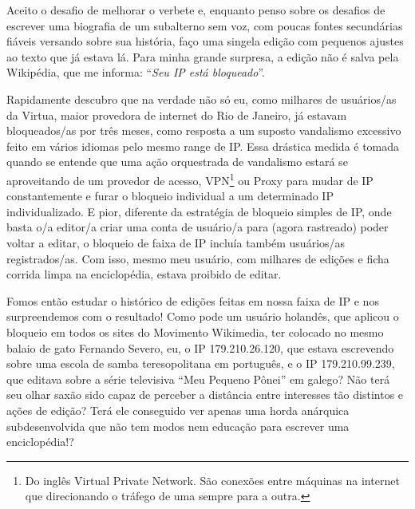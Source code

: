 Aceito o desafio de melhorar o verbete e, enquanto penso sobre os desafios de escrever uma biografia de um subalterno sem voz, com poucas fontes secundárias fiáveis versando sobre sua história, faço uma singela edição com pequenos ajustes ao texto que já estava lá. Para minha grande surpresa, a edição não é salva pela Wikipédia, que me informa: ``\textit{Seu IP está bloqueado}''.

Rapidamente descubro que na verdade não só eu, como milhares de usuários/as da Virtua, maior provedora de internet do Rio de Janeiro, já estavam bloqueados/as por três meses, como resposta a um suposto vandalismo excessivo feito em vários idiomas pelo mesmo range de IP. Essa drástica medida é tomada quando se entende que uma ação orquestrada de vandalismo estará se aproveitando de um provedor de acesso, VPN\footnote{Do inglês Virtual Private Network. São conexões entre máquinas na internet que direcionando o tráfego de uma sempre para a outra.} ou Proxy para mudar de IP constantemente e furar o bloqueio individual a um determinado IP individualizado. E pior, diferente da estratégia de bloqueio simples de IP, onde basta o/a editor/a criar uma conta de usuário/a para (agora rastreado) poder voltar a editar, o bloqueio de faixa de IP incluía também usuários/as registrados/as. Com isso, mesmo meu usuário, com milhares de edições e ficha corrida limpa na enciclopédia, estava proibido de editar.

Fomos então estudar o histórico de edições feitas em nossa faixa de IP e nos surpreendemos com o resultado! Como pode um usuário holandês, que aplicou o bloqueio em todos os sites do Movimento Wikimedia, ter colocado no mesmo balaio de gato Fernando Severo, eu, o IP 179.210.26.120, que estava escrevendo sobre uma escola de samba teresopolitana em português, e o IP 179.210.99.239, que editava sobre a série televisiva ``Meu Pequeno Pônei'' em galego? Não terá seu olhar saxão sido capaz de perceber a distância entre interesses tão distintos e ações de edição? Terá ele conseguido ver apenas uma horda anárquica subdesenvolvida que não tem modos nem educação para escrever uma enciclopédia!?

